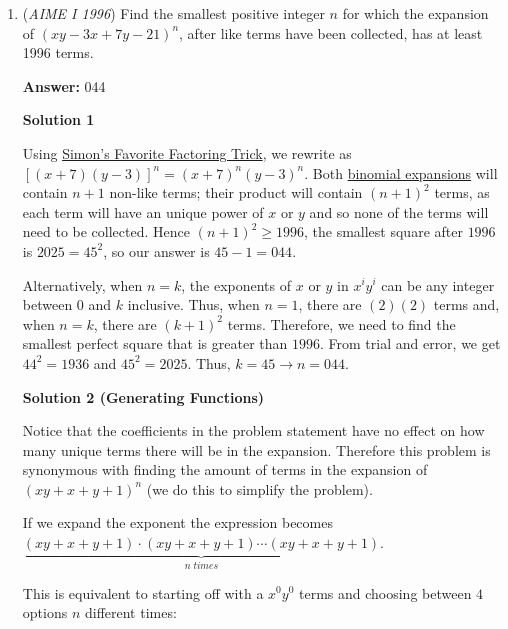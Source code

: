 \begin{enumerate}
 <div style="text-align:center;">$4\leq n <8$
$16\leq n<32$
$64\leq n<128$
$256\leq n<512$</div>There are $4$ for the first inequality, $16$ for the second, $64$ for the third, and $256$ for the fourth, so the answer is $4+16+64+256=\boxed{340}$.

 


	\item (\textit{AIME I 1996}) Find the smallest positive integer $n$ for which the expansion of $(xy-3x+7y-21)^n$, after like terms have been collected, has at least 1996 terms.


 
 \textbf{Answer: }044



\textbf{Solution 1}

Using \href{https://artofproblemsolving.com/wiki/index.php?title=Simon\%27s\_Favorite\_Factoring\_Trick}{Simon's Favorite Factoring Trick}, we rewrite as $[(x+7)(y-3)]^n = (x+7)^n(y-3)^n$. Both \href{https://artofproblemsolving.com/wiki/index.php?title=Binomial\_expansion}{binomial expansions} will contain $n+1$ non-like terms; their product will contain $(n+1)^2$ terms, as each term will have an unique power of $x$ or $y$ and so none of the terms will need to be collected. Hence $(n+1)^2 \ge 1996$, the smallest square after $1996$ is $2025 = 45^2$, so our answer is $45 - 1 = \boxed{044}$.

 Alternatively, when $n = k$, the exponents of $x$ or $y$ in $x^i y^i$ can be any integer between $0$ and $k$ inclusive. Thus, when $n=1$, there are $(2)(2)$ terms and, when $n = k$, there are $(k+1)^2$ terms. Therefore, we need to find the smallest perfect square that is greater than $1996$. From trial and error, we get $44^2 = 1936$ and $45^2 = 2025$. Thus, $k = 45\rightarrow n = \boxed{044}$.

 



\textbf{Solution 2 (Generating Functions)}

Notice that the coefficients in the problem statement have no effect on how many unique terms there will be in the expansion. Therefore this problem is synonymous with finding the amount of terms in the expansion of $(xy+x+y+1)^n$ (we do this to simplify the problem).

 If we expand the exponent the expression becomes $\underbrace{(xy+x+y+1)\cdot(xy+x+y+1)\cdots(xy+x+y+1)}_{n\;times}$.

 This is equivalent to starting off with a $x^0y^0$ terms and choosing between $4$ options $n$ different times:


\end{enumerate}
